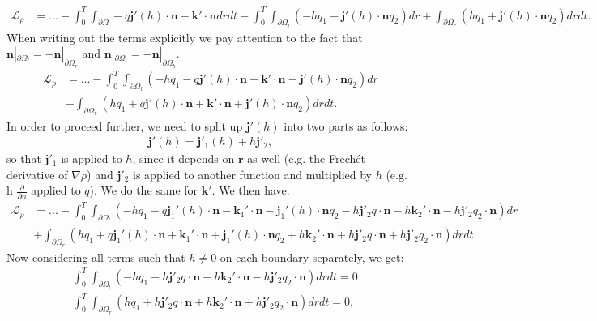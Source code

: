 \documentclass[11pt, a4paper]{article}
\theoremstyle{definition}
\newcommand{\n}{\mathbf{n}}
\newcommand{\jf}{\mathbf j}
\begin{document}
\begin{align*}
	\mathcal{L}_\rho &= ... - \int_0^T \int_{\partial \Omega}- q \jf'(h)   \cdot \n - \mathbf{k}' \cdot \n dr dt - \int_0^T \int_{\partial \Omega_l} \left(- h q_1 - \jf'(h)  \cdot \n q_2 \right)   dr  + \int_{\partial \Omega_r} \left(h q_1 + \jf'(h)  \cdot \n q_2 \right)   dr dt. 
\end{align*}
When writing out the terms explicitly we pay attention to the fact that $\n|_{\partial \Omega_l} = - \n|_{\partial \Omega_r}$ and $\n|_{\partial \Omega_t} = - \n|_{\partial \Omega_b}$.
\begin{align*}
	\mathcal{L}_\rho &= ... - \int_0^T \int_{\partial \Omega_l} \left(- h q_1 - q \jf'(h)   \cdot \n  - \mathbf{k}' \cdot \n- \jf'(h)  \cdot \n q_2 \right)   dr  \\
	&+ \int_{\partial \Omega_r} \left(h q_1 + q \jf'(h)   \cdot \n + \mathbf{k}' \cdot \n+ \jf'(h)  \cdot \n q_2 \right)   dr dt .
\end{align*}
In order to proceed further, we need to split up $\jf'(h)$ into two parts as follows:
\begin{align*}
	\jf'(h) = \jf'_1(h) + h \jf'_2,
\end{align*}
so that $\jf'_1$ is applied to $h$, since it depends on $\mathbf{r}$ as well (e.g. the Frech\'et derivative of $\nabla \rho$) and $\jf'_2$ is applied to another function and multiplied by $h$ (e.g. h $\frac{\partial }{\partial n}$ applied to $q$). We do the same for $\mathbf k'$.
We then have:
\begin{align*}
	\mathcal{L}_\rho &= ... - \int_0^T \int_{\partial \Omega_l} \left(- h q_1 - q \jf_1'(h)   \cdot \n - \mathbf{k}_1' \cdot \n - \jf_1'(h)  \cdot \n q_2  - h \jf'_2 q \cdot \n - h \mathbf{k}_2' \cdot \n-  h \jf'_2 q_2 \cdot \n \right)   dr  \\
	&+ \int_{\partial \Omega_r} \left( h q_1 + q \jf_1'(h)   \cdot \n +\mathbf{k}_1' \cdot \n+ \jf_1'(h)  \cdot \n q_2 + h\mathbf{k}_2' \cdot \n + h \jf'_2 q \cdot \n +  h \jf'_2 q_2 \cdot \n \right)   dr dt.
\end{align*}
Now considering all terms such that $h \neq 0$ on each boundary separately, we get:
\begin{align*}
	&\int_0^T \int_{\partial \Omega_l} \left(- h q_1  - h \jf'_2 q \cdot \n - h\mathbf{k}_2' \cdot \n-  h \jf'_2 q_2 \cdot \n \right)   dr  dt =0 \\
	&\int_0^T \int_{\partial \Omega_r} \left( h q_1  + h \jf'_2 q \cdot \n + h\mathbf{k}_2' \cdot \n + h \jf'_2 q_2 \cdot \n \right)   dr  dt =0 ,
\end{align*}
\end{document}
